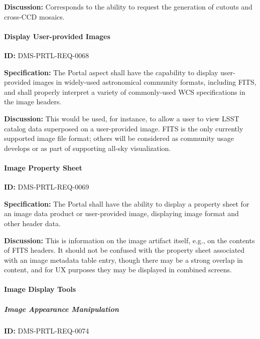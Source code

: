 \documentclass[SE,toc,lsstdraft]{lsstdoc}
\begin{document}
\textbf{Discussion:}
Corresponds to the ability to request the generation of cutouts and cross-CCD mosaics.

\paragraph{Display User-provided Images}\hfill  %

\label{DMS-PRTL-REQ-0068}
\textbf{ID:} DMS-PRTL-REQ-0068

\textbf{Specification:}
The Portal aspect shall have the capability to display user-provided images in widely-used astronomical community formats, including FITS, and shall properly interpret a variety of commonly-used WCS specifications in the image headers.

\textbf{Discussion:}
This would be used, for instance, to allow a user to view LSST catalog data superposed on a user-provided image.  FITS is the only currently supported image file format; others will be considered as community usage develops or as part of supporting all-sky visualization.

\paragraph{Image Property Sheet}\hfill  %

\label{DMS-PRTL-REQ-0069}
\textbf{ID:} DMS-PRTL-REQ-0069

\textbf{Specification:}
The Portal shall have the ability to display a property sheet for an image data product or user-provided image, displaying image format and other header data.

\textbf{Discussion:}
This is information on the image artifact itself, e.g., on the contents of FITS headers.  It should not be confused with the property sheet associated with an image metadata table entry, though there may be a strong overlap in content, and for UX purposes they may be displayed in combined screens.

\paragraph{Image Display Tools}\hfill  %

\subparagraph{Image Appearance Manipulation}\hfill  %

\label{DMS-PRTL-REQ-0074}
\textbf{ID:} DMS-PRTL-REQ-0074
\end{document}
